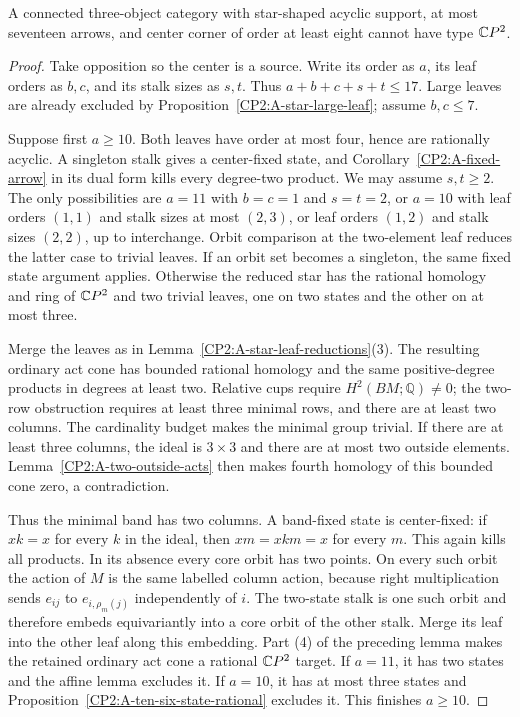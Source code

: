 \begin{proposition}
\label{CP2:A-star-large-center}
A connected three-object category with star-shaped acyclic
support, at most seventeen arrows, and center corner of
order at least eight cannot have type $\mathbb{C}P^2$.
\end{proposition}
\begin{proof}
Take opposition so the center is a source. Write its
order as $a$, its leaf orders as $b,c$, and its stalk sizes
as $s,t$. Thus $a+b+c+s+t\le17$. Large leaves are already
excluded by Proposition~\ref{CP2:A-star-large-leaf}; assume
$b,c\le7$.

Suppose first $a\ge10$. Both leaves have order at most
four, hence are rationally acyclic. A singleton stalk gives
a center-fixed state, and Corollary~\ref{CP2:A-fixed-arrow}
in its dual form kills every degree-two product. We may
assume $s,t\ge2$. The only possibilities are $a=11$ with
$b=c=1$ and $s=t=2$, or $a=10$ with leaf orders $(1,1)$
and stalk sizes at most $(2,3)$, or leaf orders $(1,2)$
and stalk sizes $(2,2)$, up to interchange. Orbit comparison
at the two-element leaf reduces the latter case to trivial
leaves. If an orbit set becomes a singleton, the same fixed
state argument applies. Otherwise the reduced star has the
rational homology and ring of $\mathbb{C}P^2$ and two trivial leaves,
one on two states and the other on at most three.

Merge the leaves as in Lemma~\ref{CP2:A-star-leaf-reductions}(3).
The resulting ordinary act cone has bounded rational
homology and the same positive-degree products in degrees
at least two. Relative cups require $H^2(BM;\mathbb Q)\ne0$;
the two-row obstruction requires at least three minimal
rows, and there are at least two columns. The cardinality
budget makes the minimal group trivial. If there are at
least three columns, the ideal is $3\times3$ and there
are at most two outside elements. Lemma~\ref{CP2:A-two-outside-acts}
then makes fourth homology of this bounded cone zero,
a contradiction.

Thus the minimal band has two columns. A band-fixed state
is center-fixed: if $xk=x$ for every $k$ in the ideal, then
$xm=xkm=x$ for every $m$. This again kills all products.
In its absence every core orbit has two points. On every
such orbit the action of $M$ is the same labelled column
action, because right multiplication sends $e_{ij}$ to
$e_{i,\rho_m(j)}$ independently of $i$. The two-state
stalk is one such orbit and therefore embeds equivariantly
into a core orbit of the other stalk. Merge its leaf into
the other leaf along this embedding. Part (4) of the
preceding lemma makes the retained ordinary act cone a
rational $\mathbb{C}P^2$ target. If $a=11$, it has two states and
the affine lemma excludes it. If $a=10$, it has at most
three states and Proposition~\ref{CP2:A-ten-six-state-rational}
excludes it. This finishes $a\ge10$.


\end{proof}
